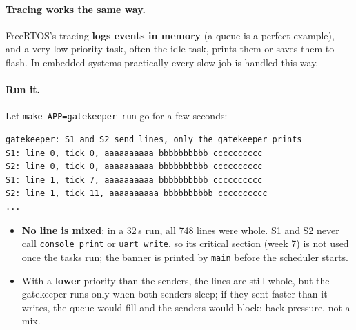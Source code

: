 \paragraph{Tracing works the same way.} FreeRTOS's tracing \textbf{logs events in memory} (a queue is a perfect example), and a very-low-priority task, often the idle task, prints them or saves them to flash. In embedded systems practically every slow job is handled this way.

\paragraph{Run it.} Let \texttt{make APP=gatekeeper run} go for a few seconds:
{\verbatimscriptsize
\begin{verbatim}
gatekeeper: S1 and S2 send lines, only the gatekeeper prints
S1: line 0, tick 0, aaaaaaaaaa bbbbbbbbbb cccccccccc
S2: line 0, tick 0, aaaaaaaaaa bbbbbbbbbb cccccccccc
S1: line 1, tick 7, aaaaaaaaaa bbbbbbbbbb cccccccccc
S2: line 1, tick 11, aaaaaaaaaa bbbbbbbbbb cccccccccc
...
\end{verbatim}}
\begin{itemize}
    \item \textbf{No line is mixed}: in a 32\,s run, all 748 lines were whole. S1 and S2 never call \texttt{console\_print} or \texttt{uart\_write}, so its critical section (week 7) is not used once the tasks run; the banner is printed by \texttt{main} before the scheduler starts.
    \item With a \textbf{lower} priority than the senders, the lines are still whole, but the gatekeeper runs only when both senders sleep; if they sent faster than it writes, the queue would fill and the senders would block: back-pressure, not a mix.
\end{itemize}


